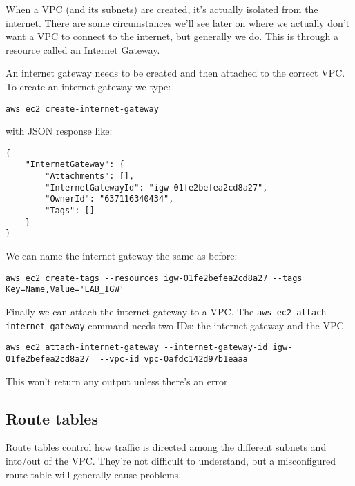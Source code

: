 \documentclass{pgnotes}
\begin{document}
When a VPC (and its subnets) are created, it's actually isolated from the internet.
There are some circumstances we'll see later on where we actually don't want a VPC to connect to the internet, but generally we do.
This is through a resource called an Internet Gateway.

An internet gateway needs to be created and then attached to the correct VPC.
To create an internet gateway we type:
\begin{verbatim}
aws ec2 create-internet-gateway
\end{verbatim}
with JSON response like:
\begin{verbatim}
{
    "InternetGateway": {
        "Attachments": [],
        "InternetGatewayId": "igw-01fe2befea2cd8a27",
        "OwnerId": "637116340434",
        "Tags": []
    }
}
\end{verbatim}
We can name the internet gateway the same as before:
\begin{verbatim}
aws ec2 create-tags --resources igw-01fe2befea2cd8a27 --tags Key=Name,Value='LAB_IGW'
\end{verbatim}
Finally we can attach the internet gateway to a VPC.
The \texttt{aws ec2 attach-internet-gateway} command needs two IDs: the internet gateway and the VPC.
\begin{verbatim}
aws ec2 attach-internet-gateway --internet-gateway-id igw-01fe2befea2cd8a27  --vpc-id vpc-0afdc142d97b1eaaa
\end{verbatim}
This won't return any output unless there's an error.

\subsection{Route tables}

Route tables control how traffic is directed among the different subnets and into/out of the VPC.
They're not difficult to understand, but a misconfigured route table will generally cause problems.
\end{document}
